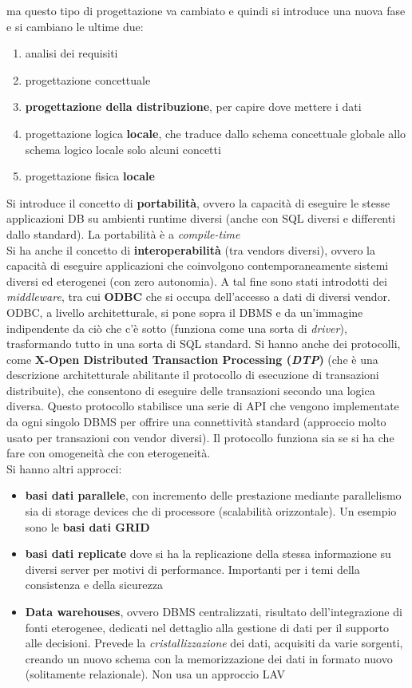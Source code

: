 \documentclass[a4paper,12pt, oneside]{book}
\begin{document}
ma questo tipo di progettazione va cambiato e quindi si introduce una nuova
fase e si cambiano le ultime due:
\begin{enumerate}
  \item analisi dei requisiti
  \item progettazione concettuale
  \item \textbf{progettazione della distribuzione}, per capire dove mettere i
  dati
  \item progettazione logica \textbf{locale}, che traduce dallo schema
  concettuale globale allo schema logico locale solo alcuni concetti
  \item progettazione fisica \textbf{locale}
\end{enumerate}
Si introduce il concetto di \textbf{portabilità}, ovvero la capacità di
eseguire le stesse applicazioni DB su ambienti runtime diversi (anche con SQL
diversi e differenti dallo standard). La portabilità è a \textit{compile-time}\\
Si ha anche il concetto di \textbf{interoperabilità} (tra vendors diversi),
ovvero la capacità di eseguire applicazioni che coinvolgono contemporaneamente
sistemi diversi ed eterogenei (con zero autonomia). A tal fine sono stati
introdotti dei \textit{middleware}, tra cui \textbf{ODBC} che si occupa
dell'accesso a dati di diversi vendor. ODBC, a livello architetturale, si pone
sopra il DBMS e da un'immagine indipendente da ciò che c'è sotto (funziona come
una sorta di \textit{driver}), trasformando tutto in una sorta di SQL
standard. Si hanno anche dei protocolli, come \textbf{X-Open Distributed
  Transaction Processing (\textit{DTP})} (che è una descrizione architetturale
abilitante il protocollo di esecuzione di transazioni distribuite), che
consentono di eseguire delle 
transazioni secondo una logica diversa. Questo protocollo stabilisce una serie
di API che vengono implementate da ogni singolo DBMS per offrire una
connettività standard (approccio molto usato per transazioni con vendor
diversi). Il protocollo funziona sia se si ha che fare con omogeneità che con
eterogeneità. \\
Si hanno altri approcci:
\begin{itemize}
  \item \textbf{basi dati parallele}, con incremento delle prestazione mediante
  parallelismo sia di storage devices che di processore (scalabilità
  orizzontale). Un esempio sono le \textbf{basi dati GRID}
  \item \textbf{basi dati replicate} dove si ha la
  replicazione della stessa informazione su diversi server per motivi di
  performance. Importanti per i temi della consistenza e della sicurezza
  \item \textbf{Data warehouses}, ovvero DBMS centralizzati, risultato
  dell'integrazione di fonti eterogenee, dedicati nel dettaglio alla gestione di
  dati per il supporto alle decisioni. Prevede la \textit{cristallizzazione} dei
  dati, acquisiti da varie sorgenti, creando un nuovo schema con la
  memorizzazione dei dati in formato nuovo (solitamente relazionale). Non usa un
  approccio LAV 
\end{itemize}
\end{document}
